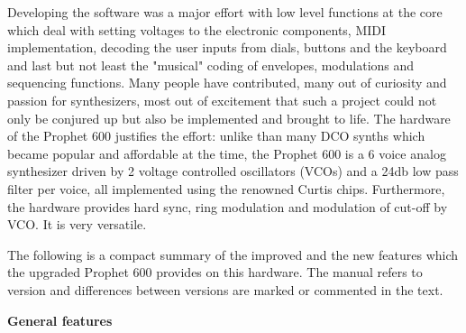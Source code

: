 \documentclass[landscape, 11pt, oneside]{report}
\newenvironment{flowtext}{\addmargin[0cm]{7cm}}{\endaddmargin} %
\begin{document}
\begin{flowtext}
Developing the software was a major effort with low level functions at the core which deal with setting voltages to the electronic components, MIDI implementation, decoding the user inputs from dials, buttons and the keyboard and last but not least the "musical" coding of envelopes, modulations and sequencing functions. Many people have contributed, many out of curiosity and passion for synthesizers, most out of excitement that such a project could not only be conjured up but also be implemented and brought to life. The hardware of the Prophet 600 justifies the effort: unlike than many DCO synths which became popular and affordable at the time, the Prophet 600 is a 6 voice analog synthesizer driven by 2 voltage controlled oscillators (VCOs) and a 24db low pass filter per voice, all implemented using the renowned Curtis chips\cite{curtis}. Furthermore, the hardware provides hard sync, ring modulation and modulation of cut-off by VCO. It is very versatile.

The following is a compact summary of the improved and the  new features which the upgraded Prophet 600 provides on this hardware. The manual refers to version \version and differences between versions are marked or commented in the text. 

\textbf{General features}
  

\end{flowtext}
\end{document}
